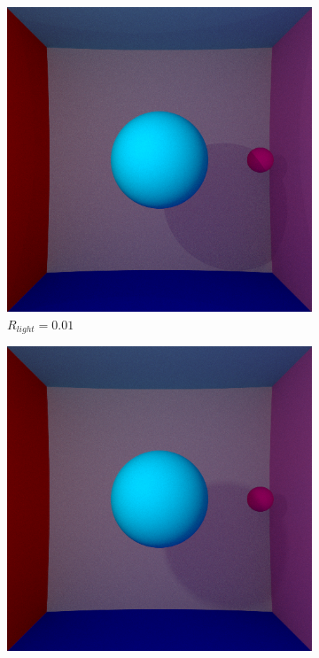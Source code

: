 \documentclass[12pt,a4paper,twoside]{report}
\begin{document}
\begin{figure}[H]
	\centering
	\begin{subfigure}{.45\textwidth}
		\centering
		\includegraphics[width=1.\linewidth]{be4_01_1000_0}
		\caption{$R_{light} = 0.01$}
		\label{fig:be4_01_1000_0}
	\end{subfigure}
	\begin{subfigure}{.45\textwidth}
		\centering
		\includegraphics[width=1.\linewidth]{be4_01_1000_1}

\end{subfigure}
\end{figure}
\end{document}
